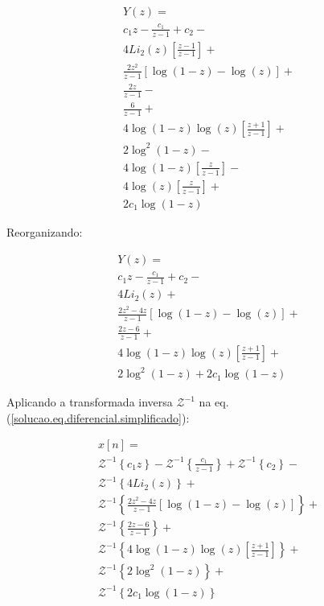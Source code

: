 \documentclass[a4paper,10pt]{article}
\begin{document}
$$
\begin{array}{lcl} 
 Y(z) = \\
 c_1z - \displaystyle \frac{c_1}{z-1}+ c_2-\\
 4 Li_2(z)\left[\displaystyle \frac{z - 1}{z-1}\right]+\\
 \displaystyle \frac{2 z^2 }{z-1}\displaystyle \left[\log(1-z) - \log(z)\right]+\\
 \displaystyle \frac{2 z}{z-1}-\\
 \displaystyle \frac{6}{z-1}+\\
 4 \log(1-z)\log(z) \left[\displaystyle \frac{ z  + 1}{z-1}\right]+\\
 2 \log^2(1-z) - \\
 4 \log(1-z) \left[\displaystyle \frac{ z }{z-1}\right]-\\
 4 \log(z)\left[\displaystyle \frac{ z }{z-1}\right] + \\
 2 c_1  \log(1-z)
\end{array}
$$

Reorganizando:

\begin{equation}
\begin{array}{lcl} 
 Y(z) = \\
 c_1z - \displaystyle \frac{c_1}{z-1}+  c_2-\\
 4 Li_2(z) +\\
 \displaystyle \frac{2 z^2 - 4z}{z-1}\displaystyle \left[\log(1-z) - \log(z)\right] +\\
 \displaystyle \frac{2 z - 6}{z-1}+\\
 4 \log(1-z)\log(z) \left[\displaystyle \frac{ z  + 1}{z-1}\right]+\\
 2 \log^2(1-z) + 2 c_1  \log(1-z)
\end{array} 
\label{solucao.eq.diferencial.simplificado}
\end{equation}


Aplicando a transformada  inversa $\mathcal{Z}^{-1}$ na eq. (\ref{solucao.eq.diferencial.simplificado}):


$$
\begin{array}{lcl} 
 x[n] = \\
 \mathcal{Z}^{-1}\left\{c_1z\right\} - 
 \mathcal{Z}^{-1}\left\{\displaystyle \frac{c_1}{z-1}\right\} + 
 \mathcal{Z}^{-1}\left\{c_2\right\}-\\
 \mathcal{Z}^{-1}\left\{4 Li_2(z)\right\}+\\
 \mathcal{Z}^{-1}\left\{\displaystyle \frac{2 z^2 - 4z}{z-1}\displaystyle \left[\log(1-z) - \log(z)\right]\right\} +\\
 \mathcal{Z}^{-1}\left\{\displaystyle \frac{2 z - 6}{z-1}\right\}+\\
 \mathcal{Z}^{-1}\left\{4 \log(1-z)\log(z) \left[\displaystyle \frac{ z  + 1}{z-1}\right]\right\}+\\
 \mathcal{Z}^{-1}\left\{2 \log^2(1-z)\right\} + \\
 \mathcal{Z}^{-1}\left\{2 c_1  \log(1-z)\right\} 
\end{array} 
$$
\end{document}
